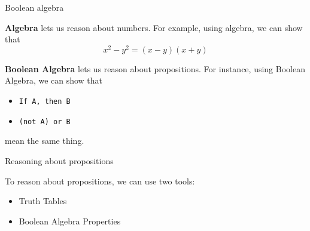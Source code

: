 \documentclass[10pt]{beamer}
\begin{document}
\begin{frame}{Boolean algebra}

\begin{myyellowbox}[title=What is algebra?]
\textbf{Algebra} lets us reason about \alert{numbers}.  For example, using algebra, we can show that
\[ x^2 - y^2 = (x-y)(x+y) \]	
\end{myyellowbox}


\vfill 
\pause 

\begin{mygreenbox}[title=What is Boolean algebra?]
\textbf{Boolean Algebra} lets us reason about \alert{propositions}.   For instance, using Boolean Algebra, we can show that
\begin{itemize}
\item \texttt{If A, then B}	
\item \texttt{(not A) or B}
\end{itemize}
mean the same thing.
\end{mygreenbox}
\end{frame}

\begin{frame}{Reasoning about propositions}

\begin{myredbox}
To reason about propositions, we can use two tools:

\begin{itemize}
	\item Truth Tables
	\item Boolean Algebra Properties
\end{itemize}	
\end{myredbox}
\end{frame}
\end{document}

